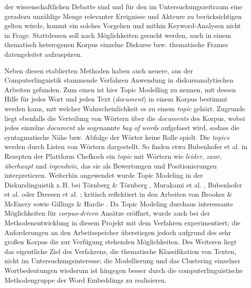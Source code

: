 der wissenschaftlichen Debatte sind und für den im Untersuchungszeitraum eine geradezu unzählige Menge relevanter Ereignisse und Akteure zu berücksichtigen gelten würde, kommt ein solches Vorgehen und mithin Keyword-Analysen nicht in Frage. Stattdessen soll nach Möglichkeiten gesucht werden, auch in einem thematisch heterogenen Korpus einzelne Diskurse bzw. thematische Frames datengeleitet aufzuspüren.

Neben diesen etablierten Methoden haben auch neuere, aus der Computerlinguistik stammende Verfahren Anwendung in diskursanalytischen Arbeiten gefunden. Zum einen ist hier Topic Modelling \autocite{bleiLatentDirichletAllocation2003} zu nennen, mit dessen Hilfe für jedes Wort und jeden Text (\emph{document}) in einem Korpus bestimmt werden kann, mit welcher Wahrscheinlichkeit es zu einem \emph{topic} gehört. Zugrunde liegt ebenfalls die Verteilung von Wörtern über die \emph{documents} des Korpus, wobei jedes einzelne \emph{document} als sogenannte \emph{bag of words} aufgefasst wird, sodass die syntagmatische Nähe bzw. Abfolge der Wörter keine Rolle spielt. Die \emph{topics} werden durch Listen von Wörtern dargestellt. So finden etwa Bubenhofer et al. \autocite*[82]{bubenhoferDigitaleKulturlinguistikDigitalitaet2022} in Rezepten der Plattform Chefkoch ein \emph{topic} mit Wörtern wie \emph{leider}, \emph{zwar}, \emph{überhaupt} und \emph{irgendwie}, das sie als Bewertungen und Positionierungen interpretieren. Weiterhin angewendet wurde Topic Modeling in der Diskurslinguistik z.\,B. bei Törnberg \& Törnberg \autocite*{tornbergMuslimsSocialMedia2016}, Murakami et al. \autocite*{murakamiWhatThisCorpus2017}, Bubenhofer et al. \autocite*{bubenhoferGrenzenUndWelten2020} oder Dreesen et al. \autocite*{dreesenOperationalisierungDiskurslinguistischenKategorie2023}; kritisch reflektiert in den Arbeiten von Brookes \& McEnery \autocite*{brookesUtilityTopicModelling2019} sowie Gillings \& Hardie \autocite*{gillingsInterpretationTopicModels2023}. Da Topic Modeling durchaus interessante Möglichkeiten für \emph{corpus-driven} Ansätze eröffnet, wurde auch bei der Methodenentwicklung in diesem Projekt mit dem Verfahren experimentiert; die Anforderungen an den Arbeitsspeicher überstiegen jedoch aufgrund des sehr großen Korpus die zur Verfügung stehenden Möglichkeiten. Des Weiteren liegt das eigentliche Ziel des Verfahrens, die thematische Klassifikation von Texten, nicht im Untersuchungsinteresse; die Modellierung und das Clustering einzelner Wortbedeutungen wiederum ist hingegen besser durch die computerlinguistische Methodengruppe der Word Embeddings zu realisieren.

